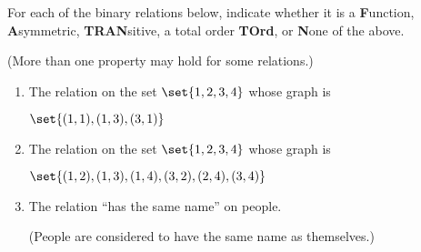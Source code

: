 \documentclass[quiz]{mcs}
\begin{document}
\begin{problem}[3]
For each of the binary relations below, indicate whether it is a
\textbf{F}unction, \textbf{A}symmetric, \textbf{TRAN}sitive, a total order
\textbf{TOrd}, or \textbf{N}one of the above.

\iffalse
 \textbf{R}eflexive,
\textbf{A}ntisymmetric, \textbf{TRAN}sitive, \textbf{TOT}al, or
\textbf{N}one of the above.
\fi

\iffalse

\begin{tabular}{l}
A \textbf{F}unction,\\
\textbf{A}symmetric,\\
\textbf{TRAN}sitive,\\
a total order \textbf{TOrd} or\\
\textbf{N}one of the above.
\end{tabular}
\fi


(More than one property may hold for some relations.)
\begin{enumerate}

\item
The relation on the set $\set{1,2,3,4}$ whose graph is

$\set{(1,1),(1,3),(3,1)}$ \hfill \brule{1.5in}

\item The relation on the set $\set{1,2,3,4}$ whose graph is

$\set{(1,2), (1,3), (1,4), (3,2), (2,4), (3,4)}$ \hfill \brule{1.5in}

\item The relation ``has the same name'' on people.   \hfill \brule{1.5in}

(People are considered to have the same name as themselves.)
\end{enumerate}

\end{problem}



\end{document}
